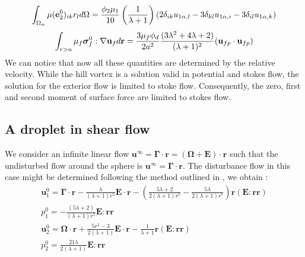 \begin{equation*}
    \int_{\Omega_\alpha} \mu(\textbf{e}_2^0)_{ik} r_l d\Omega =
    \frac{\phi_2\mu_1}{10}\left(\frac{1}{\lambda+1}\right)
    \left(
        2\delta_{ik}u_{1 \alpha , l}
        -3\delta_{kl}u_{1 \alpha , i}
        -3\delta_{il}u_{1 \alpha , k}
    \right)
\end{equation*}
\begin{equation*}
    \int_{r>a} \mu_f \bm\sigma^0_f:\mathbf{\nabla} \textbf{u}_f  d\textbf{r}
    = 
    \frac{3\mu_f \phi_d}{2a^2}
    \frac{(3\lambda^2 + 4\lambda +2)}{(\lambda + 1)^2}
    (\textbf{u}_{fp}\cdot \textbf{u}_{fp})
\end{equation*}
We can notice that now all these quantities are determined by the relative velocity.  
While the hill vortex is a solution valid in potential and stokes flow, the solution for the exterior flow is limited to stoke flow. 
Consequently, the zero, first and second moment of surface force are limited to stokes flow. 

\subsection{A droplet in shear flow}

We consider an infinite linear flow $\textbf{u}^\infty = \bm\Gamma\cdot \textbf{r} =(\bm\Omega + \textbf{E})\cdot \textbf{r} $ such that the undisturbed flow around the sphere is $\textbf{u}^\infty = \bm\Gamma\cdot\textbf{r}$.
The disturbance flow in this case might be determined following the method outlined in \citep{leal2007advanced}, we obtain  :
\begin{align*}
    \textbf{u}^0_1
    = \bm\Gamma\cdot\textbf{r}
    -\frac{\lambda}{(\lambda + 1)r^5} \textbf{E}\cdot\textbf{r}
    - \left(\frac{5\lambda +2}{2(\lambda +1 )r^5} - \frac{5\lambda}{2(\lambda+1)r^7}\right) \textbf{r}(\textbf{E}:\textbf{rr})\\
    p_1^0 
    = -\frac{(5\lambda+2)}{(\lambda+1)r^5}\textbf{E}:\textbf{rr}\\
    \textbf{u}^0_2
    = \bm\Omega\cdot\textbf{r}
    + \frac{5r^2- 3}{2(\lambda + 1)} 
    \textbf{E}\cdot\textbf{r}
    -\frac{1}{\lambda+1} \textbf{r}(\textbf{E}:\textbf{rr})\\
    p_2^0 
    = \frac{21\lambda}{2(\lambda+1)}
    \textbf{E}:\textbf{rr}
\end{align*}

